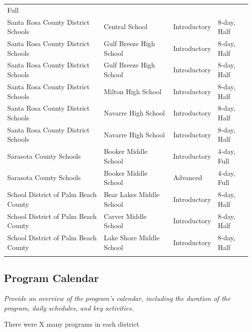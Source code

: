 \documentclass[
]{article}
\begin{document}
\begin{longtable}[]{@{}llll@{}}
Full \\
Santa Rosa County District Schools & Central School & Introductory &
8-day, Half \\
Santa Rosa County District Schools & Gulf Breeze High School &
Introductory & 8-day, Half \\
Santa Rosa County District Schools & Gulf Breeze High School &
Introductory & 8-day, Half \\
Santa Rosa County District Schools & Milton High School & Introductory &
8-day, Half \\
Santa Rosa County District Schools & Navarre High School & Introductory
& 8-day, Half \\
Santa Rosa County District Schools & Navarre High School & Introductory
& 8-day, Half \\
Sarasota County Schools & Booker Middle School & Introductory & 4-day,
Full \\
Sarasota County Schools & Booker Middle School & Advanced & 4-day,
Full \\
School District of Palm Beach County & Bear Lakes Middle School &
Introductory & 8-day, Half \\
School District of Palm Beach County & Carver Middle School &
Introductory & 8-day, Half \\
School District of Palm Beach County & Lake Shore Middle School &
Introductory & 8-day, Half \\
& & & \\
\end{longtable}

\hypertarget{program-calendar}{%
\subsection{Program Calendar}\label{program-calendar}}

\emph{Provide an overview of the program's calendar, including the
duration of the program, daily schedules, and key activities.}

There were X many programs in each district
\end{document}
